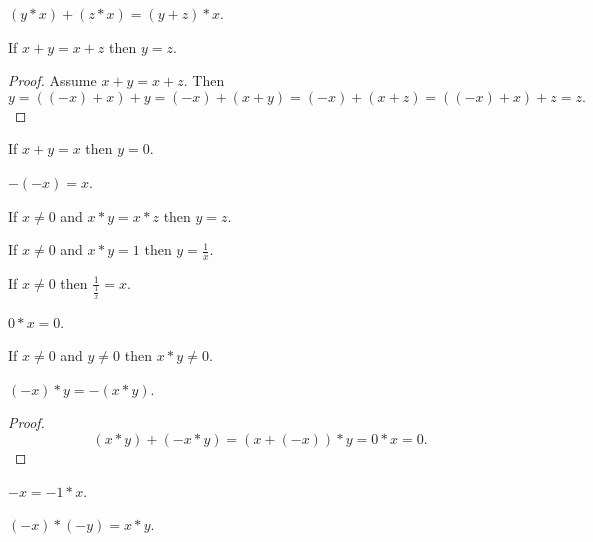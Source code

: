 \documentclass{article}
\begin{document}
\begin{forthel}

\begin{lemma} $(y * x) + (z * x) = (y + z) * x$.
\end{lemma}

\begin{lemma} If $x + y = x + z$ then $y = z$.
\end{lemma}
\begin{proof} 
Assume $x + y = x + z$. Then
$$y = ((-x) + x) + y = (-x) + (x+y) = (-x) + (x+z) = ((-x) + x) + z = z.$$
\end{proof}

\begin{lemma} If $x + y = x$ then $y = 0$.
\end{lemma}

\begin{lemma} $-(-x) = x$.
\end{lemma}

\begin{lemma} If $x \neq 0$ and $x * y = x * z$ then $y = z$.
\end{lemma}

\begin{lemma} If $x \neq 0$ and $x * y = 1$ then $y = \frac{1}{x}$.
\end{lemma}

\begin{lemma} If $x \neq 0$ then $\frac{1}{\frac{1}{x}} = x$.
\end{lemma}

\begin{lemma} $0 * x = 0$.
\end{lemma}

\begin{lemma} If $x \neq 0$ and $y \neq 0$ then $x * y \neq 0$.
\end{lemma}

\begin{lemma} $(-x) * y = -(x * y)$.
\end{lemma}
\begin{proof} $$(x * y) + (-x * y) = (x + (-x)) * y = 
0 * x = 0.$$ 
\end{proof}

\begin{lemma} $-x = -1 * x$.
\end{lemma}

\begin{lemma} $(-x) * (-y) = x * y$.
\end{lemma}

\end{forthel}
\end{document}
